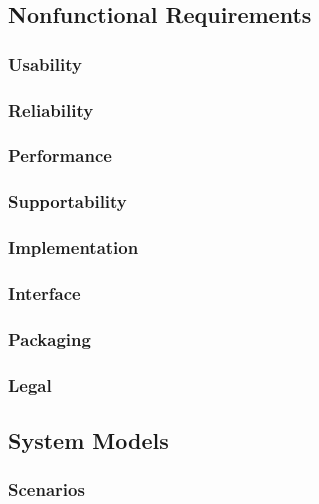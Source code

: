 \documentclass[11pt]{article}
\begin{document}
    \subsection{Nonfunctional Requirements}

        \subsubsection{Usability}

        \subsubsection{Reliability}

        \subsubsection{Performance}

        \subsubsection{Supportability}

        \subsubsection{Implementation}

        \subsubsection{Interface}

        \subsubsection{Packaging}

        \subsubsection{Legal}
    
    \subsection{System Models}

        \subsubsection{Scenarios}
\end{document}
